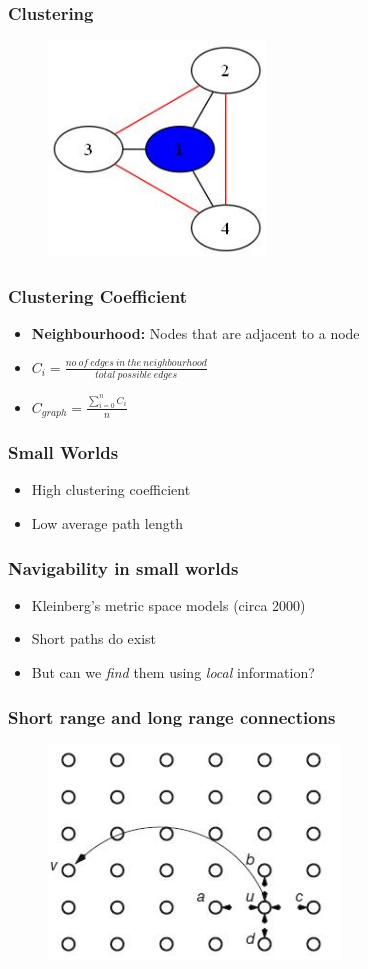 \documentclass{beamer}
\begin{document}
		\frame
		{
			\frametitle{Clustering}
			\begin{centering}			
			\begin{figure}
				\includegraphics[height=2.25in]{cluster.jpg}
			\end{figure}
			\end{centering}						
		}
		\frame
		{
			\frametitle{Clustering Coefficient}
				\begin{itemize}
					\item<1-> {\textbf{Neighbourhood:} Nodes that are adjacent to a node}
					\item<2-> {$C_{i} = \frac{no\ of\ edges\ in\ the\ neighbourhood}{total\ possible\ edges}$}
					\item<3-> {$C_{graph} = \frac{\sum_{i=0}^n C_{i}}{n}$}
				\end{itemize}
		}
		\frame
		{
			\frametitle{Small Worlds}
				\begin{itemize}
					\item<1-> {High clustering coefficient}
					\item<1-> {Low average path length}
				\end{itemize}
		}
		\frame
		{
			\frametitle{Navigability in small worlds}
				\begin{itemize}
				\item<1-> {Kleinberg's metric space models (circa 2000)}
				\item<2-> {Short paths do exist}
				\item<3-> {But can we \textit{find} them using \textit{local} information?}	
				\end{itemize}
		}
		\frame
		{
			\frametitle{Short range and long range connections}
			\begin{centering}			
			\begin{figure}
				\includegraphics[height=2.25in]{grid.jpg}
			\end{figure}
			\end{centering}
		}
\end{document}
